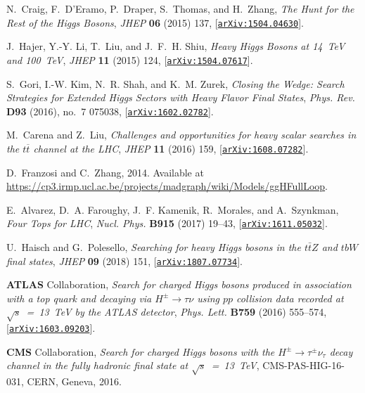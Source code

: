 \documentclass[review]{elsarticle}
\begin{document}
\begin{thebibliography}{100}
N.~Craig, F.~D'Eramo, P.~Draper, S.~Thomas, and H.~Zhang, {\it {The Hunt for
  the Rest of the Higgs Bosons}},  {\em JHEP} {\bf 06} (2015) 137,
  [\href{http://arxiv.org/abs/1504.04630}{{\tt arXiv:1504.04630}}].

J.~Hajer, Y.-Y. Li, T.~Liu, and J.~F.~H. Shiu, {\it {Heavy Higgs Bosons at 
14~TeV and 100~TeV}},  {\em JHEP} {\bf 11} (2015) 124,
  [\href{http://arxiv.org/abs/1504.07617}{{\tt arXiv:1504.07617}}].

S.~Gori, I.-W. Kim, N.~R. Shah, and K.~M. Zurek, {\it {Closing the Wedge:
  Search Strategies for Extended Higgs Sectors with Heavy Flavor Final
  States}},  {\em Phys. Rev.} {\bf D93} (2016), no.~7 075038,
  [\href{http://arxiv.org/abs/1602.02782}{{\tt arXiv:1602.02782}}].

M.~Carena and Z.~Liu, {\it {Challenges and opportunities for heavy scalar
  searches in the $ t\overline{t} $ channel at the LHC}},  {\em JHEP} {\bf 11}
  (2016) 159, [\href{http://arxiv.org/abs/1608.07282}{{\tt arXiv:1608.07282}}].

D.~Franzosi and C.~Zhang, 2014.
\newblock Available at
  \url{https://cp3.irmp.ucl.ac.be/projects/madgraph/wiki/Models/ggHFullLoop}.

E.~Alvarez, D.~A. Faroughy, J.~F. Kamenik, R.~Morales, and A.~Szynkman, {\it
  {Four Tops for LHC}},  {\em Nucl. Phys.} {\bf B915} (2017) 19--43,
  [\href{http://arxiv.org/abs/1611.05032}{{\tt arXiv:1611.05032}}].
  
U.~Haisch and G.~Polesello, {\it {Searching for heavy Higgs bosons in the $t
  \bar t Z$ and $t b W$ final states}},  {\em JHEP} {\bf 09} (2018) 151,
  [\href{http://arxiv.org/abs/1807.07734}{{\tt arXiv:1807.07734}}].  

{\bf ATLAS} Collaboration, {\it {Search for charged Higgs
  bosons produced in association with a top quark and decaying via $H^{\pm}
  \rightarrow \tau\nu$ using $pp$ collision data recorded at $\sqrt{s}$~=~13~TeV 
  by the ATLAS detector}},  {\em Phys. Lett.} {\bf B759} (2016) 555--574,
  [\href{http://arxiv.org/abs/1603.09203}{{\tt arXiv:1603.09203}}].

{\bf CMS} Collaboration, {\it {Search for charged Higgs bosons with the
  $H^{\scriptscriptstyle \pm}\rightarrow \tau^{\scriptscriptstyle
  \pm}\nu_{\tau}$ decay channel in the fully hadronic final state at $\sqrt{s}$~=~13~TeV}},
    CMS-PAS-HIG-16-031, CERN, Geneva, 2016.


\end{thebibliography}
\end{document}
